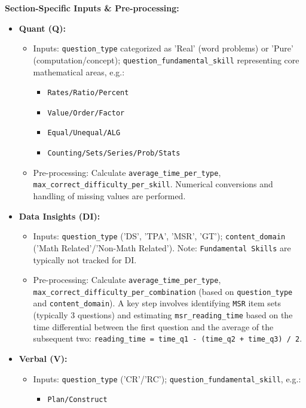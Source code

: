 \documentclass{article}
\begin{document}
\textbf{Section-Specific Inputs \& Pre-processing:}
\begin{itemize}
    \item \textbf{Quant (Q):}
    \begin{itemize}
        \item Inputs: \texttt{question\_type} categorized as 'Real' (word problems) or 'Pure' (computation/concept); \texttt{question\_fundamental\_skill} representing core mathematical areas, e.g.:
            \begin{itemize}
                \item \texttt{Rates/Ratio/Percent}
                \item \texttt{Value/Order/Factor}
                \item \texttt{Equal/Unequal/ALG}
                \item \texttt{Counting/Sets/Series/Prob/Stats}
            \end{itemize}
        \item Pre-processing: Calculate \texttt{average\_time\_per\_type}, \texttt{max\_correct\_difficulty\_per\_skill}. Numerical conversions and handling of missing values are performed.
    \end{itemize}
    \item \textbf{Data Insights (DI):}
    \begin{itemize}
        \item Inputs: \texttt{question\_type} ('DS', 'TPA', 'MSR', 'GT'); \texttt{content\_domain} ('Math Related'/'Non-Math Related'). Note: \texttt{Fundamental Skills} are typically not tracked for DI.
        \item Pre-processing: Calculate \texttt{average\_time\_per\_type}, \texttt{max\_correct\_difficulty\_per\_combination} (based on \texttt{question\_type} and \texttt{content\_domain}). A key step involves identifying \texttt{MSR} item sets (typically 3 questions) and estimating \texttt{msr\_reading\_time} based on the time differential between the first question and the average of the subsequent two: \texttt{reading\_time = time\_q1 - (time\_q2 + time\_q3) / 2}.
    \end{itemize}
    \item \textbf{Verbal (V):}
    \begin{itemize}
        \item Inputs: \texttt{question\_type} ('CR'/'RC'); \texttt{question\_fundamental\_skill}, e.g.:
            \begin{itemize}
                \item \texttt{Plan/Construct}

\end{itemize}
\end{itemize}
\end{itemize}
\end{document}

